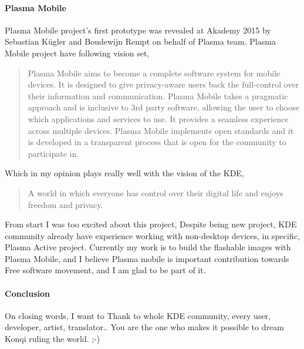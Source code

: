 \paragraph{Plasma Mobile} Plasma Mobile project's first prototype was revealed at Akademy 2015 by Sebastian Kügler and Boudewijn Rempt on behalf of Plasma team. Plasma Mobile project have following vision set,

\begin{quote}
Plasma Mobile aims to become a complete software system for mobile devices. It is designed to give privacy-aware users back the full-control over their information and communication. Plasma Mobile takes a pragmatic approach and is inclusive to 3rd party software, allowing the user to choose which applications and services to use. It provides a seamless experience across multiple devices. Plasma Mobile implements open standards and it is developed in a transparent process that is open for the community to participate in.
\end{quote}

\noindent{}Which in my opinion plays really well with the vision of the KDE,

\begin{quote}
A world in which everyone has control over their digital life and enjoys freedom and privacy.
\end{quote}

\noindent{}From start I was too excited about this project, Despite being new project, KDE community already have experience working with non-desktop devices, in specific, Plasma Active project. Currently my work is to build the flashable images with Plasma Mobile, and I believe Plasma mobile is important contribution towards Free software movement, and I am glad to be part of it.

\paragraph{Conclusion} On closing words, I want to Thank to whole KDE community, every user, developer, artist, translator.. You are the one who makes it possible to dream Konqi ruling the world. ;-)
